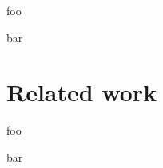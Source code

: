 \documentclass[conference]{IEEEtran}
\begin{document}
foo\par bar

\section{Related work}

foo\par bar

%
%



%
%
\end{document}
